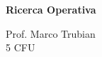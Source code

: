 \documentclass[\main/main.tex]{subfiles}
\begin{document}
\begin{titlepage}
    \begin{center}
        \vspace*{1em}
        
        \textbf{\large{Ricerca Operativa}}
        
        \vspace{1em}
        Prof. Marco Trubian
        \\
        \small{5 CFU}
        \vspace{1em}
        
		 
        
    \end{center}
\end{titlepage}
\end{document}

